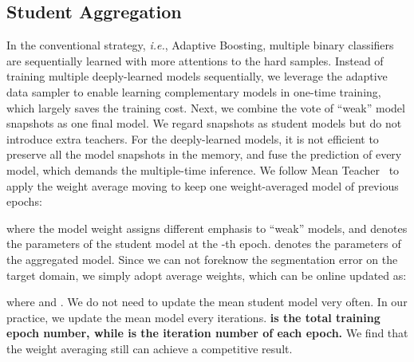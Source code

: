 \documentclass[journal]{IEEEtran}
\def\ie{\emph{i.e.}}
\begin{document}
\subsection{Student Aggregation} \label{sec:aggregation}
In the conventional strategy, \ie, Adaptive Boosting, multiple binary classifiers are sequentially learned with more attentions to the hard samples. Instead of training multiple deeply-learned models sequentially, we leverage the adaptive data sampler to enable learning complementary models in one-time training, which largely saves the training cost. Next, we combine the vote of ``weak'' model snapshots as one final model. We regard snapshots as student models but do not introduce extra teachers. For the deeply-learned models, it is not efficient to preserve all the model snapshots in the memory, and fuse the prediction of every model, which demands the multiple-time inference. We follow Mean Teacher~\cite{tarvainen2017mean} to apply the weight average moving to keep one weight-averaged model of previous epochs:

where the model weight  assigns different emphasis to  ``weak'' models, and  denotes the parameters of the student model at the -th epoch.  denotes the parameters of the aggregated model. Since we can not foreknow the segmentation error on the target domain, we simply adopt average weights, which can be online updated as:

where  and . We do not need to update the mean student model very often. In our practice, we update the mean model every  iterations. \textbf{ is the total training epoch number, while  is the iteration number of each epoch.}
We find that the weight averaging still can achieve a competitive result. 
\end{document}
